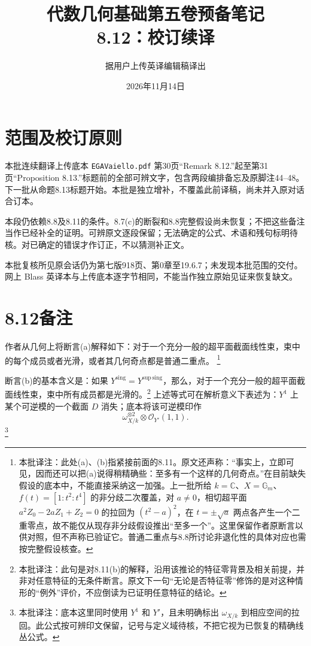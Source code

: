 \documentclass[openany]{ctexbook}
\title{代数几何基础第五卷预备笔记\\8.12：校订续译}
\author{据用户上传英译编辑稿译出}
\date{2026年11月14日}
\newcommand{\note}[1]{\footnote{本批译注：#1}}
\newcommand{\Ys}{Y^{\mathrm{sing}}}
\newcommand{\Yss}{Y^{\mathrm{sup\,sing}}}
\begin{document}
\maketitle
\chapter*{范围及校订原则}
本批连续翻译上传底本 \texttt{EGAVaiello.pdf} 第30页“Remark 8.12.”起至第31页“Proposition 8.13.”标题前的全部可辨文字，包含两段编排备忘及原脚注44--48。下一批从命题8.13标题开始。本批是独立增补，不覆盖此前译稿，尚未并入原对话合订本。

本段仍依赖8.8及8.11的条件。8.7(c)的断裂和8.8完整假设尚未恢复；不把这些备注当作已经补全的证明。可辨原文逐段保留；无法确定的公式、术语和残句标明待核。对已确定的错误才作订正，不以猜测补正文。

本批复核所见原会话仍为第七版918页、第0章至19.6.7；未发现本批范围的交付。网上 Blass 英译本与上传底本逐字节相同，不能当作独立原始见证来恢复缺文。

\chapter*{8.12\quad 备注}
作者从几何上将断言(a)解释如下：对于一个充分一般的超平面截面线性束，束中的每个成员或者光滑，或者其几何奇点都是普通二重点。
\note{此处(a)、(b)指紧接前面的8.11。原文还声称：“事实上，立即可见，因而还可以把(a)说得稍精确些：至多有一个这样的几何奇点。”在目前缺失假设的底本中，不能直接采纳这一加强。上一批所给 $k=\mathbb C$、$X=\mathbb G_m$、$f(t)=[1:t^2:t^4]$ 的非分歧二次覆盖，对 $a\ne0$，相切超平面 $a^2Z_0-2aZ_1+Z_2=0$ 的拉回为 $(t^2-a)^2$，在 $t=\pm\sqrt a$ 两点各产生一个二重零点，故不能仅从现存非分歧假设推出“至多一个”。这里保留作者原断言以供对照，但不声称已验证它。普通二重点与8.8所讨论非退化性的具体对应也需按完整假设核查。}

断言(b)的基本含义是：如果 $\Ys=\Yss$，那么，对于一个充分一般的超平面截面线性束，束中所有成员都是光滑的。\note{此句是对8.11(b)的解释，沿用该推论的特征零背景及相关前提，并非对任意特征的无条件断言。原文下一句“无论是否特征零”修饰的是对这种情形的“例外”评价，不应倒读为已证明任意特征的结论。}
上述等式可在解析意义下表述为：$Y^1$ 上某个可逆模的一个截面 $D$ 消失；底本将该可逆模印作
\[
\omega_{X/k}^{\otimes2}\otimes\mathcal O_{Y'}(1,1).
\]
\note{底本这里同时使用 $Y^1$ 和 $Y'$，且未明确标出 $\omega_{X/k}$ 到相应空间的拉回。此公式按可辨印文保留，记号与定义域待核，不把它视为已恢复的精确线丛公式。}
\end{document}
